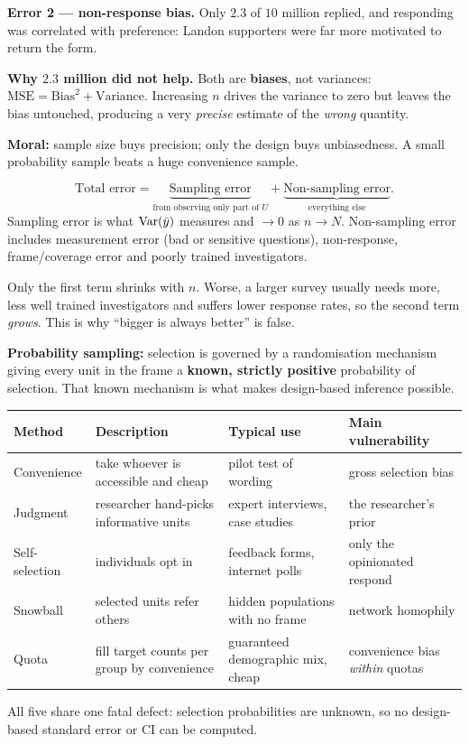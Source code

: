\textbf{Error 2 --- non-response bias.} Only $2.3$ of $10$ million replied, and responding was
correlated with preference: Landon supporters were far more motivated to return the form.

\textbf{Why $2.3$ million did not help.} Both are \textbf{biases}, not variances:
$\text{MSE}=\text{Bias}^2+\text{Variance}$. Increasing $n$ drives the variance to zero but leaves
the bias untouched, producing a very \emph{precise} estimate of the \emph{wrong} quantity.

\textbf{Moral:} sample size buys precision; only the design buys unbiasedness. A small
probability sample beats a huge convenience sample.

\sol
\[
  \text{Total error}=\underbrace{\text{Sampling error}}_{\text{from observing only part of }U}
  +\underbrace{\text{Non-sampling error}}_{\text{everything else}} .
\]
Sampling error is what $\operatorname{Var}(\bar{y})$ measures and $\to0$ as $n\to N$. Non-sampling error includes
measurement error (bad or sensitive questions), non-response, frame/coverage error and poorly
trained investigators.

Only the first term shrinks with $n$. Worse, a larger survey usually needs more, less well
trained investigators and suffers lower response rates, so the second term \emph{grows}. This is
why ``bigger is always better'' is false.

\sol \textbf{Probability sampling:} selection is governed by a randomisation mechanism giving
every unit in the frame a \textbf{known, strictly positive} probability of selection. That known
mechanism is what makes design-based inference possible.
\begin{center}\small
\begin{tabular}{@{}p{2.2cm}p{5.2cm}p{3.4cm}p{3.4cm}@{}}
\toprule
Method & Description & Typical use & Main vulnerability \\
\midrule
Convenience & take whoever is accessible and cheap & pilot test of wording & gross selection bias \\
Judgment & researcher hand-picks informative units & expert interviews, case studies & the researcher's prior \\
Self-selection & individuals opt in & feedback forms, internet polls & only the opinionated respond \\
Snowball & selected units refer others & hidden populations with no frame & network homophily \\
Quota & fill target counts per group by convenience & guaranteed demographic mix, cheap & convenience bias \emph{within} quotas \\
\bottomrule
\end{tabular}
\end{center}
All five share one fatal defect: selection probabilities are unknown, so no design-based standard
error or CI can be computed.

